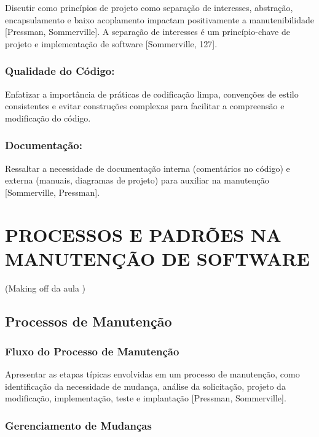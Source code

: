 \documentclass[
]{book}
\begin{document}
Discutir como princípios de projeto como separação de interesses, abstração, encapsulamento e baixo acoplamento impactam positivamente a manutenibilidade {[}Pressman, Sommerville{]}. A separação de interesses é um princípio-chave de projeto e implementação de software {[}Sommerville, 127{]}.

\subsection{Qualidade do Código:}\label{qualidade-do-cuxf3digo}

Enfatizar a importância de práticas de codificação limpa, convenções de estilo consistentes e evitar construções complexas para facilitar a compreensão e modificação do código.

\subsection{Documentação:}\label{documentauxe7uxe3o}

Ressaltar a necessidade de documentação interna (comentários no código) e externa (manuais, diagramas de projeto) para auxiliar na manutenção {[}Sommerville, Pressman{]}.

\chapter{PROCESSOS E PADRÕES NA MANUTENÇÃO DE SOFTWARE}\label{processos-e-padruxf5es-na-manutenuxe7uxe3o-de-software}

(Making off da aula )

\section{Processos de Manutenção}\label{processos-de-manutenuxe7uxe3o}

\subsection{Fluxo do Processo de Manutenção}\label{fluxo-do-processo-de-manutenuxe7uxe3o}

Apresentar as etapas típicas envolvidas em um processo de manutenção, como identificação da necessidade de mudança, análise da solicitação, projeto da modificação, implementação, teste e implantação {[}Pressman, Sommerville{]}.

\subsection{Gerenciamento de Mudanças}\label{gerenciamento-de-mudanuxe7as}
\end{document}
